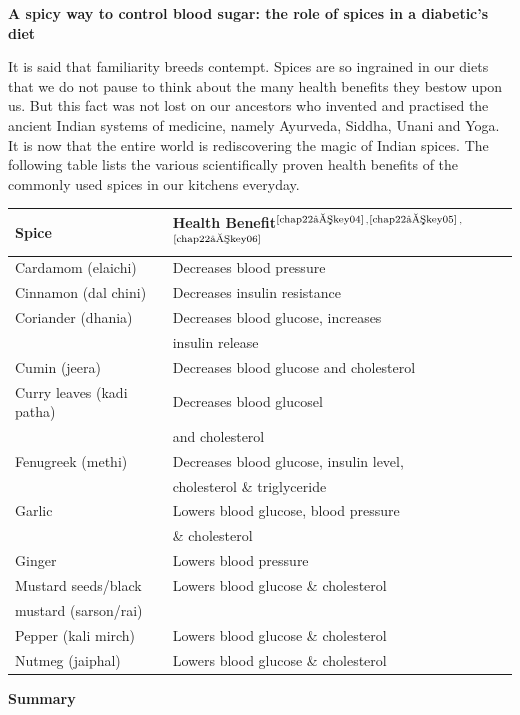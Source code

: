 \noindent\textbf{A spicy way to control blood sugar: the role of spices in a diabetic’s diet}

It is said that familiarity breeds contempt. Spices are so ingrained in our diets that we do not pause to think about the many health benefits they bestow upon us. But this fact was not lost on our ancestors who invented and practised the ancient Indian systems of medicine, namely Ayurveda, Siddha, Unani and Yoga. It is now that the entire world is rediscovering the magic of Indian spices. The following table lists the various scientifically proven health benefits of the commonly used spices in our kitchens everyday.

\begin{center}
\begin{tabular}{|l|l|}
\hline
\textbf{Spice} & \textbf{Health Benefit}$^{\text{\cite{chap22–key04}}}$$^,$$^{\text{\cite{chap22–key05}}}$$^,$$^{\text{\cite{chap22–key06}}}$\\
\hline
Cardamom (elaichi) & Decreases blood pressure\\
\hline
Cinnamon (dal chini) & Decreases insulin resistance\\
\hline
Coriander (dhania) & Decreases blood glucose, increases\\
 & insulin release\\
\hline
Cumin (jeera) & Decreases blood glucose and cholesterol\\
\hline
Curry leaves (kadi patha) & Decreases blood glucosel\\
 & and cholesterol\\
\hline
Fenugreek (methi) & Decreases blood glucose, insulin level,\\
 & cholesterol \& triglyceride\\
\hline
Garlic & Lowers blood glucose, blood pressure\\
 & \& cholesterol\\
\hline
Ginger & Lowers blood pressure\\
\hline
Mustard seeds/black & Lowers blood glucose \& cholesterol\\
\hline
mustard (sarson/rai) &\\
Pepper (kali mirch) & Lowers blood glucose \& cholesterol\\
\hline
Nutmeg (jaiphal) & Lowers blood glucose \& cholesterol\\
\hline
\end{tabular}
\end{center}

\noindent\textbf{Summary}

